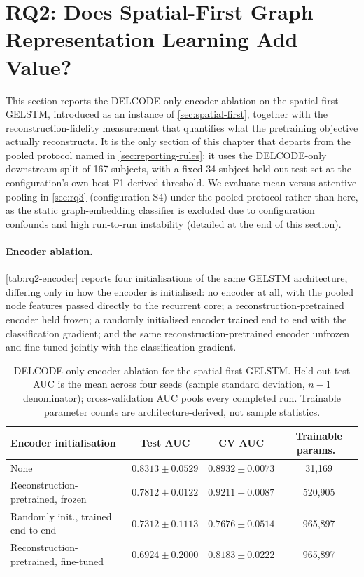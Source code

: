 \section{RQ2: Does Spatial-First Graph Representation Learning Add Value?}\label{sec:rq2}

This section reports the \ac{DELCODE}-only encoder ablation on the spatial-first
\ac{GELSTM}, introduced as an instance of \autoref{sec:spatial-first}, together with the
reconstruction-fidelity measurement that quantifies what the pretraining objective actually
reconstructs. It is the only section of this chapter that departs from the pooled protocol
named in \autoref{sec:reporting-rules}: it uses the \ac{DELCODE}-only downstream split of
167 subjects, with a fixed 34-subject held-out test set at the configuration's own
best-F1-derived threshold. We evaluate mean versus attentive pooling in \autoref{sec:rq3}
(configuration S4) under the pooled protocol rather than here, as the static graph-embedding classifier
is excluded due to configuration confounds and high run-to-run instability (detailed at the
end of this section).

\paragraph{Encoder ablation.} \autoref{tab:rq2-encoder} reports four initialisations of the
same \ac{GELSTM} architecture, differing only in how the encoder is initialised: no encoder
at all, with the pooled node features passed directly to the recurrent core; a
reconstruction-pretrained encoder held frozen; a randomly initialised encoder trained end to
end with the classification gradient; and the same reconstruction-pretrained encoder
unfrozen and fine-tuned jointly with the classification gradient.

\begin{table}[htbp]
\centering
\small
\caption{\ac{DELCODE}-only encoder ablation for the spatial-first \ac{GELSTM}. Held-out
  test \ac{AUC} is the mean across four seeds (sample standard deviation, $n-1$
  denominator); cross-validation \ac{AUC} pools every completed run. Trainable parameter
  counts are architecture-derived, not sample statistics.}
\label{tab:rq2-encoder}
\begin{tabular}{@{}p{4.3cm}ccc@{}}
\toprule
Encoder initialisation & Test \ac{AUC} & \ac{CV} \ac{AUC} & Trainable params.\ \\
\midrule
None & $0.8313 \pm 0.0529$ & $0.8932 \pm 0.0073$ & 31{,}169 \\
Reconstruction-pretrained, frozen & $0.7812 \pm 0.0122$ & $0.9211 \pm 0.0087$ & 520{,}905 \\
Randomly init., trained end to end & $0.7312 \pm 0.1113$ & $0.7676 \pm 0.0514$ & 965{,}897 \\
Reconstruction-pretrained, fine-tuned & $0.6924 \pm 0.2000$ & $0.8183 \pm 0.0222$ & 965{,}897 \\
\bottomrule
\end{tabular}
\end{table}

